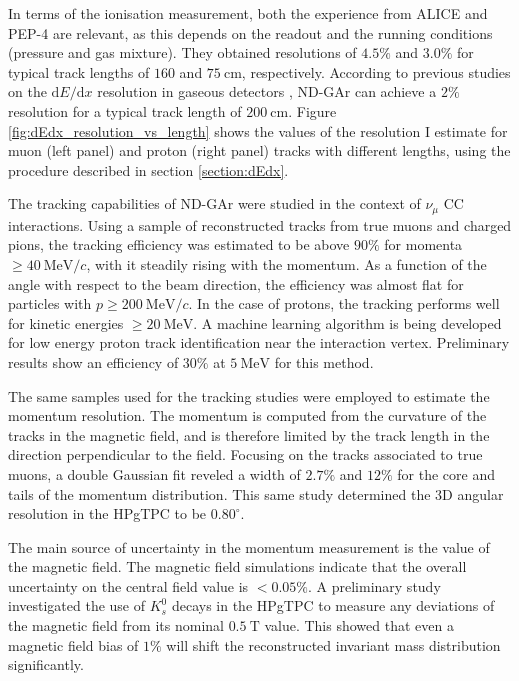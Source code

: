 In terms of the ionisation measurement, both the experience from ALICE and PEP-4 are relevant, as this depends on the readout and the running conditions (pressure and gas mixture). They obtained resolutions of $4.5\%$ and $3.0\%$ for typical track lengths of $160$ and $75~\mathrm{cm}$, respectively. According to previous studies on the $\mathrm{d}E/\mathrm{d}x$ resolution in gaseous detectors \cite{Lehraus1983}, ND-GAr can achieve a $2\%$ resolution for a typical track length of $200~\mathrm{cm}$. Figure \ref{fig:dEdx_resolution_vs_length} shows the values of the resolution I estimate for muon (left panel) and proton (right panel) tracks with different lengths, using the procedure described in section \ref{section:dEdx}.

The tracking capabilities of ND-GAr were studied in the context of $\nu_{\mu}$ CC interactions. Using a sample of reconstructed tracks from true muons and charged pions, the tracking efficiency was estimated to be above $90\%$ for momenta $\geq 40 ~ \mathrm{MeV}/c$, with it steadily rising with the momentum. As a function of the angle with respect to the beam direction, the efficiency was almost flat for particles with $p\geq 200 ~ \mathrm{MeV}/c$. In the case of protons, the tracking performs well for kinetic energies $\geq 20 ~ \mathrm{MeV}$. A machine learning algorithm is being developed for low energy proton track identification near the interaction vertex. Preliminary results show an efficiency of $30\%$ at $5 ~ \mathrm{MeV}$ for this method.

The same samples used for the tracking studies were employed to estimate the momentum resolution. The momentum is computed from the curvature of the tracks in the magnetic field, and is therefore limited by the track length in the direction perpendicular to the field. Focusing on the tracks associated to true muons, a double Gaussian fit reveled a width of $2.7\%$ and $12\%$ for the core and tails of the momentum distribution. This same study determined the 3D angular resolution in the HPgTPC to be $0.80^{\circ}$.

The main source of uncertainty in the momentum measurement is the value of the magnetic field. The magnetic field simulations indicate that the overall uncertainty on the central field value is $< 0.05 \%$. A preliminary study investigated the use of $K_{s}^{0}$ decays in the HPgTPC to measure any deviations of the magnetic field from its nominal $0.5 ~ \mathrm{T}$ value. This showed that even a magnetic field bias of $1\%$ will shift the reconstructed invariant mass distribution significantly.

